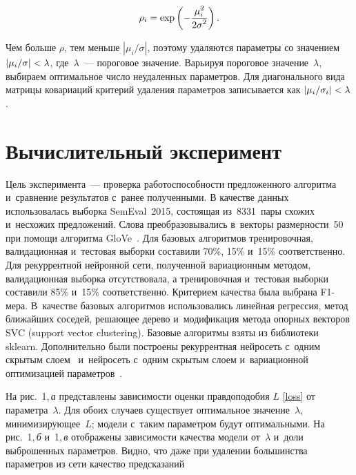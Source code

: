 \begin{multicols}{2}
\vspace*{-12pt}

\noindent
\begin{equation*}
\rho_i = \exp\left(-\displaystyle\frac{\displaystyle \mu_i^2\mathstrut}{\displaystyle 2\sigma^2\mathstrut}\right).
\end{equation*}

\vspace*{-12pt}

\noindent
Чем больше $\rho$, тем меньше $|{\mu_i}/{\sigma}|$, поэтому удаляются 
параметры со значением $|{\mu_i}/{\sigma}|\hm < \lambda$, где~$\lambda$~--- 
пороговое значение. Варьируя пороговое значение~$\lambda$, выбираем оптимальное 
число неудаленных параметров.
Для диагонального вида матрицы ковариаций критерий удаления параметров 
записывается как $|{\mu_i}/{\sigma_i}| \hm< \lambda$.

\vspace*{-20pt}

\section{Вычислительный эксперимент}

\vspace*{-12pt}

Цель эксперимента~--- проверка работоспособности предложенного алгоритма 
и~сравнение результатов с~ранее полученными. В качестве данных использовалась 
выборка SemEval~2015, состоящая из~8331~пары схожих и~несхожих предложений. 
Слова преобразовывались в~векторы размерности~50 при помощи алгоритма 
GloVe~\cite{GloveURL}.
Для базовых алгоритмов тренировочная, валидационная и~тес\-то\-вая выборки составили 
70\%, 15\% и~15\% соответственно.
Для рекуррентной нейронной сети, полученной вариационным методом, валидационная 
выборка отсутствовала, а тренировочная и~тес\-то\-вая выборки составили 85\% и~15\% 
соответственно.
Критерием качества была выбрана F1-ме\-ра.
В~качестве базовых алгоритмов использовались линейная регрессия, метод ближайших 
соседей, ре\-ша\-ющее дерево и~модификация метода опорных векторов SVC
(support vector clustering). Базовые 
алгоритмы взяты из биб\-лио\-те\-ки sklearn.
Дополнительно были построены рекуррентная нейросеть с~одним скрытым 
слоем~\cite{Sanborn} и~нейросеть с~одним скрытым слоем и~вариационной 
оптимизацией параметров~\cite{Graves, code}.
{

}





На рис.~1,\,\textit{а} представлены зависимости оценки 
правдоподобия $L$ \eqref{loss} от параметра~$\lambda$.
Для обоих случаев существует оптимальное значение~$\lambda$, минимизирующее~$L$; 
модели с~таким параметром будут оптимальными. На 
рис.~1,\,\textit{б} и~1,\,\textit{в} 
отображены зависимости качества модели от~$\lambda$ и~доли выброшенных 
параметров. Видно, что даже при удалении большинства параметров из сети качество 
предсказаний\linebreak\vspace*{-12pt}

\pagebreak

\end{multicols}



